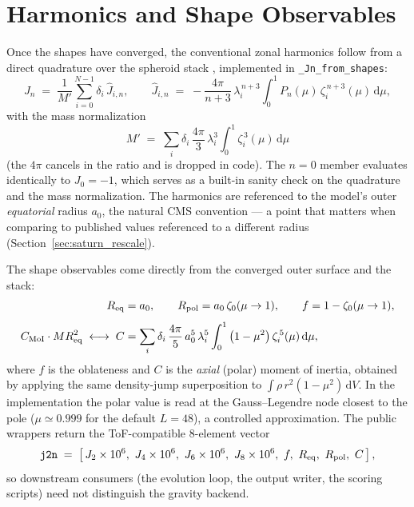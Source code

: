 \documentclass{aastex631}
\newcommand{\dd}{\mathrm{d}}
\newcommand{\Req}{R_{\rm eq}}
\newcommand{\Rpol}{R_{\rm pol}}
\begin{document}
\section{Harmonics and Shape Observables}\label{sec:observables}

Once the shapes have converged, the conventional zonal harmonics follow
from a direct quadrature over the spheroid stack
\citep[][Eqs.~11--12]{MilitzerHubbard2024}, implemented in
\texttt{\_Jn\_from\_shapes}:
\begin{equation}
J_n \;=\; \frac{1}{M'} \sum_{i=0}^{N-1} \delta_i\, \hat{J}_{i,n},
\qquad
\hat{J}_{i,n} \;=\; -\frac{4\pi}{n+3}\, \lambda_i^{\,n+3}
\int_0^1 P_n(\mu)\, \zeta_i^{\,n+3}(\mu)\,\dd\mu ,
\label{eq:Jn}
\end{equation}
with the mass normalization
\begin{equation}
M' \;=\; \sum_i \delta_i\, \frac{4\pi}{3}\, \lambda_i^3
\int_0^1 \zeta_i^{\,3}(\mu)\,\dd\mu
\label{eq:Mnorm}
\end{equation}
(the $4\pi$ cancels in the ratio and is dropped in code).  The $n=0$
member evaluates identically to $J_0 = -1$, which serves as a built-in
sanity check on the quadrature and the mass normalization.  The
harmonics are referenced to the model's outer \emph{equatorial} radius
$a_0$, the natural CMS convention --- a point that matters when comparing
to published values referenced to a different radius
(Section~\ref{sec:saturn_rescale}).

The shape observables come directly from the converged outer surface and
the stack:
\begin{align}
\Req &= a_0, \qquad
\Rpol = a_0\, \zeta_0(\mu \to 1), \qquad
f = 1 - \zeta_0(\mu \to 1),
\label{eq:shape_obs}\\[4pt]
C_{\rm MoI} \cdot M \Req^2 \;\longleftrightarrow\;
C &= \sum_i \delta_i\, \frac{4\pi}{5}\, a_0^5\, \lambda_i^5
\int_0^1 \left(1-\mu^2\right) \zeta_i^{\,5}(\mu)\,\dd\mu ,
\label{eq:moi}
\end{align}
where $f$ is the oblateness and $C$ is the \emph{axial} (polar) moment
of inertia, obtained by applying the same density-jump superposition to
$\int \rho\, r^2 (1-\mu^2)\, \dd V$.  In the implementation the polar
value is read at the Gauss--Legendre node closest to the pole
($\mu \simeq 0.999$ for the default $L = 48$), a controlled
approximation.  The public wrappers return the ToF-compatible 8-element
vector
\begin{equation}
\texttt{j2n} \;=\;
\left[\, J_2 \times 10^6,\ J_4 \times 10^6,\ J_6 \times 10^6,\
J_8 \times 10^6,\ f,\ \Req,\ \Rpol,\ C \,\right],
\label{eq:j2n}
\end{equation}
so downstream consumers (the evolution loop, the output writer, the
scoring scripts) need not distinguish the gravity backend.
\end{document}
